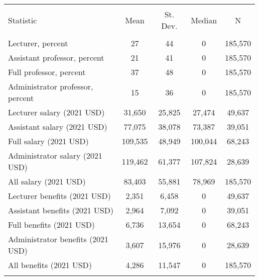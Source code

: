 
\begin{tabular}{@{\extracolsep{5pt}}lcccc} 
\\[-1.8ex]\hline 
\hline \\[-1.8ex] 
Statistic & \multicolumn{1}{c}{Mean} & \multicolumn{1}{c}{St. Dev.} & \multicolumn{1}{c}{Median} & \multicolumn{1}{c}{N} \\ 
\hline \\[-1.8ex] 
Lecturer, percent & 27 & 44 & 0 & 185,570 \\ 
Assistant professor, percent & 21 & 41 & 0 & 185,570 \\ 
Full professor, percent & 37 & 48 & 0 & 185,570 \\ 
Administrator professor, percent & 15 & 36 & 0 & 185,570 \\ 
Lecturer salary (2021 USD) & 31,650 & 25,825 & 27,474 & 49,637 \\ 
Assistant salary (2021 USD) & 77,075 & 38,078 & 73,387 & 39,051 \\ 
Full salary (2021 USD) & 109,535 & 48,949 & 100,044 & 68,243 \\ 
Administrator salary (2021 USD) & 119,462 & 61,377 & 107,824 & 28,639 \\ 
All salary (2021 USD) & 83,403 & 55,881 & 78,969 & 185,570 \\ 
Lecturer benefits (2021 USD) & 2,351 & 6,458 & 0 & 49,637 \\ 
Assistant benefits (2021 USD) & 2,964 & 7,092 & 0 & 39,051 \\ 
Full benefits (2021 USD) & 6,736 & 13,654 & 0 & 68,243 \\ 
Administrator benefits (2021 USD) & 3,607 & 15,976 & 0 & 28,639 \\ 
All benefits (2021 USD) & 4,286 & 11,547 & 0 & 185,570 \\ 
\hline \\[-1.8ex] 
\end{tabular} 
